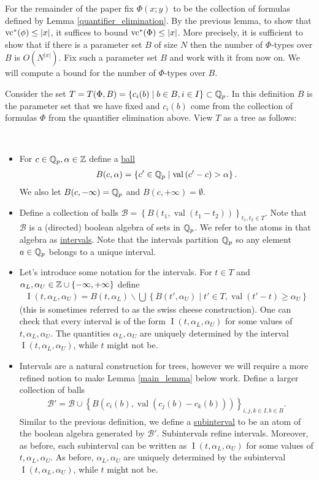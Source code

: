 \documentclass{amsart}
\newcommand{\BB}{\mathscr B}
\newcommand{\curly}[1]{\left\{#1\right\}}
\newcommand{\paren}[1]{\left(#1\right)}
\DeclareMathOperator{\vval}{val}
\DeclareMathOperator{\inti}{I}
\newcommand{\defn}{\underline}
\newcommand{\interval}{\inti(t, \alpha_L, \alpha_U)}
\begin{document}
For the remainder of the paper fix $\Phi(x; y)$ to be the collection of formulas defined by Lemma \ref{quantifier_elimination}.
By the previous lemma, to show that $\operatorname{vc}^*(\phi) \leq |x|$, it suffices to bound $\operatorname{vc}^*(\Phi) \leq |x|$.
More precisely, it is sufficient to show that if there is a parameter set $B$ of size $N$
then the number of $\Phi$-types over $B$ is $O(N^{|x|})$.
Fix such a parameter set $B$ and work with it from now on.
We will compute a bound for the number of $\Phi$-types over $B$.

Consider the set $T = T(\Phi, B) = \curly{c_i(b) \mid b \in B, i \in I} \subset \Q_p$.
In this definition $B$ is the parameter set that we have fixed 
and $c_i(b)$ come from the collection of formulas $\Phi$ from the quantifier elimination above.
View $T$ as a tree as follows:
\begin{Definition} \ 
  \begin{itemize}
  \item For $c \in \mathbb{Q}_p, \alpha \in \mathbb{Z}$  define a \defn{ball} 
    \begin{align*}
      B(c, \alpha) = \curly{c' \in \Q_p \mid \vval \paren{c' - c} > \alpha}.  
    \end{align*}
    We also let $B(c, -\infty) = \mathbb{Q}_p$ and $B(c, +\infty) = \emptyset$.
  \item Define a collection of balls $\BB = \curly{B(t_1, \vval(t_1 - t_2))}_{t_1, t_2 \in T}$.
    Note that $\BB$ is a (directed) boolean algebra of sets in $\mathbb{Q}_p$.
    We refer to the atoms in that algebra as \defn{intervals}.
    Note that the intervals partition $\mathbb{Q}_p$ so any element $a \in \mathbb{Q}_p$ belongs to a unique interval.
  \item Let's introduce some notation for the intervals.
    For $t \in T$ and $\alpha_L, \alpha_U \in \Z \cup \curly{-\infty, +\infty}$ define
    \begin{align*}
      \interval = B(t, \alpha_L) \backslash \bigcup \curly{B(t', \alpha_U) \mid t' \in T, \vval(t' - t) \geq \alpha_U}
    \end{align*}
    (this is sometimes referred to as the swiss cheese construction).
    One can check that every interval is of the form $\interval$ for some values of $t, \alpha_L, \alpha_U$.
    The quantities $\alpha_L, \alpha_U$ are uniquely determined by the interval $\interval$,
    while $t$ might not be.
  \item Intervals are a natural construction for trees, however we will require a more refined notion to make Lemma \ref{main_lemma} below work.
    Define a larger collection of balls 
    \begin{align*}
      \BB' = \BB \cup \curly{B(c_i(b), \vval(c_j(b) - c_k(b)))}_{i,j,k \in I, b \in B}.  
    \end{align*}
    Similar to the previous definition, we define a \defn{subinterval} to be an atom of the boolean algebra generated by $\BB'$.
    Subintervals refine intervals.
    Moreover, as before, each subinterval can be written as $\interval$ for some values of $t, \alpha_L, \alpha_U$.
    As before, $\alpha_L, \alpha_U$ are uniquely determined by the subinterval $\interval$,
    while $t$ might not be.
  \end{itemize}
\end{Definition}
\end{document}
